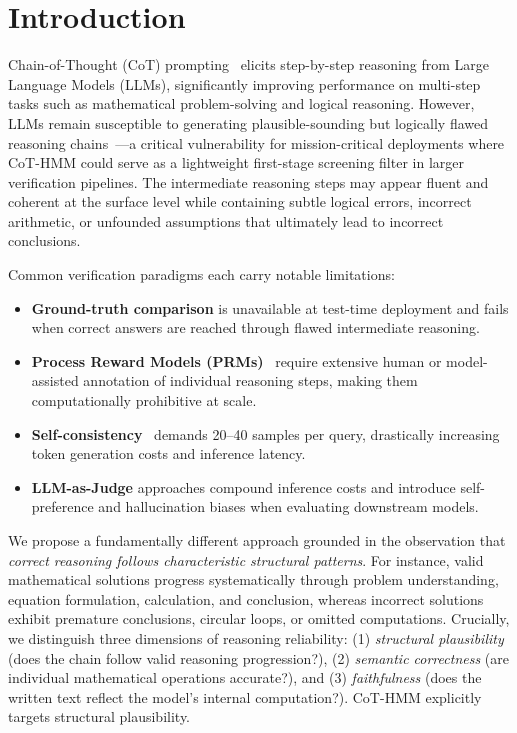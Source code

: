 \documentclass{llncs}
\begin{document}
\section{Introduction}

Chain-of-Thought (CoT) prompting~\cite{wei2022chain} elicits step-by-step reasoning from Large Language Models (LLMs), significantly improving performance on multi-step tasks such as mathematical problem-solving and logical reasoning. However, LLMs remain susceptible to generating plausible-sounding but logically flawed reasoning chains~\cite{ji2023survey}---a critical vulnerability for mission-critical deployments where CoT-HMM could serve as a lightweight first-stage screening filter in larger verification pipelines. The intermediate reasoning steps may appear fluent and coherent at the surface level while containing subtle logical errors, incorrect arithmetic, or unfounded assumptions that ultimately lead to incorrect conclusions.

Common verification paradigms each carry notable limitations:
\begin{itemize}
    \item \textbf{Ground-truth comparison} is unavailable at test-time deployment and fails when correct answers are reached through flawed intermediate reasoning.
    \item \textbf{Process Reward Models (PRMs)}~\cite{lightman2024let} require extensive human or model-assisted annotation of individual reasoning steps, making them computationally prohibitive at scale.
    \item \textbf{Self-consistency}~\cite{wang2023self} demands 20--40 samples per query, drastically increasing token generation costs and inference latency.
    \item \textbf{LLM-as-Judge} approaches compound inference costs and introduce self-preference and hallucination biases when evaluating downstream models.
\end{itemize}

We propose a fundamentally different approach grounded in the observation that \textit{correct reasoning follows characteristic structural patterns}. For instance, valid mathematical solutions progress systematically through problem understanding, equation formulation, calculation, and conclusion, whereas incorrect solutions exhibit premature conclusions, circular loops, or omitted computations. Crucially, we distinguish three dimensions of reasoning reliability: (1) \textit{structural plausibility} (does the chain follow valid reasoning progression?), (2) \textit{semantic correctness} (are individual mathematical operations accurate?), and (3) \textit{faithfulness} (does the written text reflect the model's internal computation?). CoT-HMM explicitly targets structural plausibility.
\end{document}
